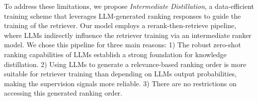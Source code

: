 To address these limitations, we propose \textit{Intermediate Distillation}, a data-efficient training scheme that leverages LLM-generated ranking responses to guide the training of the retriever. 
Our model employs a rerank-then-retrieve pipeline, where LLMs indirectly influence the retriever training via an intermediate ranker model.
We chose this pipeline for three main reasons:
1) The robust zero-shot ranking capabilities of LLMs establish a strong foundation for knowledge distillation.
2) Using LLMs to generate a relevance-based ranking order is more suitable for retriever training than depending on LLMs output probabilities, making the supervision signals more reliable.
3) There are no restrictions on accessing this generated ranking order.


